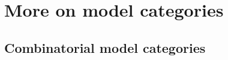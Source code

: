 \documentclass[main.tex]{subfiles}
\begin{document}
\chapter{More on model categories}
\label{ch:more_on_model_categories}

\section{Combinatorial model categories}
\label{sec:combinatorial_model_categories}
\end{document}
